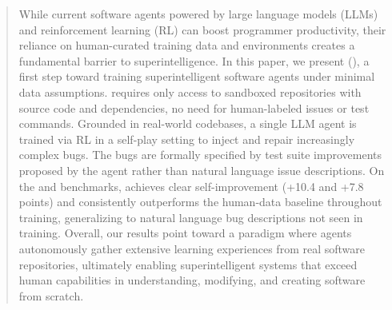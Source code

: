 \begin{abstract}
While current software agents powered by large language models (LLMs) and reinforcement learning (RL) can boost programmer productivity, their reliance on human-curated training data and environments creates a fundamental barrier to superintelligence.
In this paper, we present \mbox{\techfull} (\tech), a first step toward training superintelligent software agents under minimal data assumptions.
\tech requires only access to sandboxed repositories with source code and dependencies, no need for human-labeled issues or test commands.
Grounded in real-world codebases, a single LLM agent is trained via RL in a self-play setting to inject and repair increasingly complex bugs.
The bugs are formally specified by test suite improvements proposed by the agent rather than natural language issue descriptions.
On the \sbv and \sbp benchmarks, \tech achieves clear self-improvement (+10.4 and +7.8 points) and consistently outperforms the human-data baseline throughout training, generalizing to natural language bug descriptions not seen in training.
Overall, our results point toward a paradigm where agents autonomously gather extensive learning experiences from real software repositories, ultimately enabling superintelligent systems that exceed human capabilities in understanding, modifying, and creating software from scratch.


\end{abstract}
